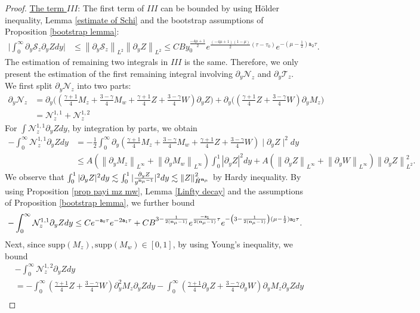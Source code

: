 \documentclass{article}
\newcommand{\norm}[1]{\left\lVert#1\right\rVert}
\newcommand{\ga}{\gamma}
\newcommand{\pa}{\partial}
\def\beqa{\begin{equation}\begin{aligned}}
\def\eeqa{\end{aligned}\end{equation}}
\def\espz{Z}
\def\espw{W}
\def\mz{M_z}
\def\mw{M_w}
\def\nz{\mathcal N_z}
\def\nmz{\mathcal T_z}
\def\epone{\mathtt{a_1}}
\def\eptwo{\mathtt{a_2}}
\def\epzero{\mathtt{a_0}}
\def\ndmu{{\bf{n}_{\mu}}}
\numberwithin{equation}{section}
\begin{document}
\begin{proof}
		\noindent \underline{The term $III$}: The first term of $III$ can be bounded by using H\"{o}lder inequality, Lemma \ref{estimate of Schi} and the bootstrap assumptions of Proposition \ref{bootstrap lemma}:
		 \beqa\label{II-4}
		 	\Big| \int_{0}^\infty \pa_y\mathcal S_z \pa_y Z dy\Big| & \leq \norm{\pa_y\mathcal S_z}_{L^2} \norm{\pa_y Z}_{L^2}
			\leq CB y_0^{\frac{-4\mu +1}{2}}  %
            e^{\frac{(-4\mu+1)(1-\mu)}{2}(\tau-\tau_0)}e^{-(\mu-\frac12)\eptwo\tau}.
		 \eeqa
The estimation of remaining two integrals in $III$ is the same. Therefore, we only present the estimation of the first remaining integral involving $\pa_y\nz$ and $\pa_y\nmz$. We first split $\pa_y\nz$ into two parts: 
		 \begin{align*}
         \pa_y\nz &  = \pa_y\Big( (\frac{\ga+1}{4}\mz+\frac{3-\ga}{4}\mw+\frac{\ga+1}{4}\espz+\frac{3-\ga}{4}\espw)\partial_y\espz\Big)  +\pa_y\Big( (\frac{\ga+1}{4}\espz+\frac{3-\ga}{4} \espw)\pa_y\mz\Big)\\
        &  = \nz^{1,1} + \nz^{1,2}
         \end{align*}
    For $\int \nz^{1,1} \pa_y \espz dy $,  by integration by parts, we obtain 
		 \begin{align*}
		 	- \int_0^\infty \nz^{1,1} \pa_y \espz dy 
			&= - \frac12 \int_0^\infty  \pa_y(\frac{\ga+1}{4}\mz+\frac{3-\ga}{4}\mw+\frac{\ga+1}{4}\espz+\frac{3-\ga}{4}\espw)\mid\partial_y\espz \mid^2 dy \\
			&\leq A ( \norm{\pa_y \mz}_{L^\infty} +\norm{\pa_y \mw}_{L^\infty}) \int_0^{1}|\pa_y Z|^2 dy   + A  (  \norm{\pa_y \espz}_{L^\infty} +\norm{\pa_y \espw}_{L^\infty} ) \norm{\pa_y Z}_{L^2}^2.
		 \end{align*}
		 We observe that $\int_0^1|\pa_y Z|^2 dy \lesssim \int_0^1|\frac{\pa_y Z}{y^{\ndmu-1}}|^2 dy \lesssim \norm{\espz}_{\dot H^\ndmu}^2 $ by Hardy inequality. By using Proposition \ref{prop payi mz mw}, Lemma  \ref{Linfty decay} 
         and  the assumptions of Proposition \ref{bootstrap lemma}, we further bound 
		 $$
		 	- \int_0^\infty \nz^{1,1} \pa_y \espz dy \leq C e^{-\epzero \tau} e^{-2\epone \tau} 
            + C B^{3- \frac{1}{2(\ndmu-1)}} e^{\frac{-\epone}{2(\ndmu-1)}\tau} e^{-\left(3-\frac{1}{2(\ndmu-1)}\right)(\mu-\frac12)\eptwo \tau}.
		 $$
		 Next, since $\text{supp}(\mz), \text{supp}(\mw) \in [0,1]$, 
         by using Young's inequality, we bound
		 \begin{align*}
         	& - \int_0^\infty \nz^{1,2} \pa_y \espz dy\\
            &= - \int_0^\infty  (\frac{\ga+1}{4}\espz+\frac{3-\ga}{4} \espw)\pa_y^2\mz  \pa_y \espz dy - \int_0^\infty (\frac{\ga+1}{4}\pa_y \espz+\frac{3-\ga}{4} \pa_y \espw)\pa_y\mz \pa_y \espz dy \\ 

\end{align*}
\end{proof}
\end{document}
